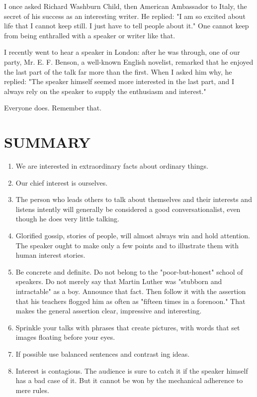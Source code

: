 \documentclass[10pt]{article}
\begin{document}
I once asked Richard Washburn Child, then American Ambassador to Italy, the secret of his success as an interesting writer. He replied: "I am so excited about life that I cannot keep still. I just have to tell people about it." One cannot keep from being enthralled with a speaker or writer like that.

I recently went to hear a speaker in London: after he was through, one of our party, Mr. E. F. Benson, a well-known English novelist, remarked that he enjoyed the last part of the talk far more than the first. When I asked him why, he replied: "The speaker himself seemed more interested in the last part, and I always rely on the speaker to supply the enthusiasm and interest."

Everyone does. Remember that.

\section*{SUMMARY}
\begin{enumerate}
  \item We are interested in extraordinary facts about ordinary things.
  \item Our chief interest is ourselves.
  \item The person who leads others to talk about themselves and their interests and listens intently will generally be considered a good conversationalist, even though he does very little talking.
  \item Glorified gossip, stories of people, will almost always win and hold attention. The speaker ought to make only a few points and to illustrate them with human interest stories.
  \item Be concrete and definite. Do not belong to the "poor-but-honest" school of speakers. Do not merely say that Martin Luther was "stubborn and intractable" as a boy. Announce that fact. Then follow it with the assertion that his teachers flogged him as often as "fifteen times in a forenoon." That makes the general assertion clear, impressive and interesting.
  \item Sprinkle your talks with phrases that create pictures, with words that set images floating before your eyes.
  \item If possible use balanced sentences and contrast ing ideas.
  \item Interest is contagious. The audience is sure to catch it if the speaker himself has a bad case of it. But it cannot be won by the mechanical adherence to mere rules.
\end{enumerate}
\end{document}
